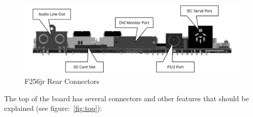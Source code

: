 \documentclass[oneside]{book}
\begin{document}
\begin{figure}[ht]
    \begin{center}
        \includegraphics[scale=0.75]{images/f256_render_annotated_back.pdf}
    \end{center}
    \caption{F256jr Rear Connectors}
    \label{fig:rear}
\end{figure}

The top of the board has several connectors and other features that should be explained (see figure:~\ref{fig:top}):
\end{document}
